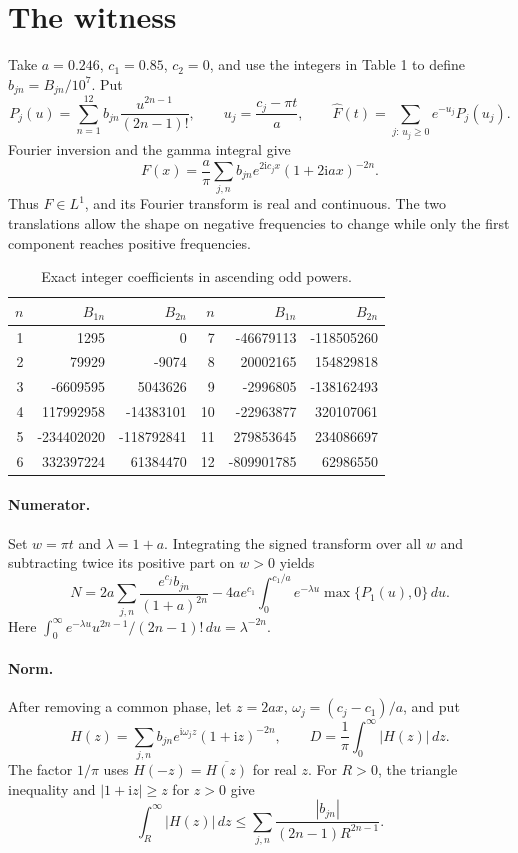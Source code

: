 \documentclass[11pt]{article}
\newcommand{\ii}{\mathrm i}
\begin{document}
\newpage
\section{The witness}
Take $a=0.246$, $c_1=0.85$, $c_2=0$, and use the integers in Table 1 to
define $b_{jn}=B_{jn}/10^7$. Put
\[
 P_j(u)=\sum_{n=1}^{12} b_{jn}\frac{u^{2n-1}}{(2n-1)!},\qquad
 u_j=\frac{c_j-\pi t}{a},\qquad
 \widehat F(t)=\sum_{j:\,u_j\ge0}e^{-u_j}P_j(u_j).
\]
Fourier inversion and the gamma integral give
\[
 F(x)=\frac a\pi\sum_{j,n} b_{jn} e^{2\ii c_jx}(1+2\ii ax)^{-2n}.
\]
Thus $F\in L^1$, and its Fourier transform is real and continuous. The
two translations allow the shape on negative frequencies to change while
only the first component reaches positive frequencies.

\begin{table}[h]
\centering
\begin{tabular}{r rr@{\qquad}r rr}
\toprule
$n$ & $B_{1n}$ & $B_{2n}$ & $n$ & $B_{1n}$ & $B_{2n}$ \\
\midrule
1 & 1295 & 0 & 7 & -46679113 & -118505260 \\
2 & 79929 & -9074 & 8 & 20002165 & 154829818 \\
3 & -6609595 & 5043626 & 9 & -2996805 & -138162493 \\
4 & 117992958 & -14383101 & 10 & -22963877 & 320107061 \\
5 & -234402020 & -118792841 & 11 & 279853645 & 234086697 \\
6 & 332397224 & 61384470 & 12 & -809901785 & 62986550 \\
\bottomrule
\end{tabular}
\caption{Exact integer coefficients in ascending odd powers.}
\end{table}

\paragraph{Numerator.} Set $w=\pi t$ and $\lambda=1+a$. Integrating the
signed transform over all $w$ and subtracting twice its positive part on
$w>0$ yields
\[
 N=2a\sum_{j,n}\frac{e^{c_j}b_{jn}}{(1+a)^{2n}}
       -4ae^{c_1}\int_0^{c_1/a}e^{-\lambda u}\max\{P_1(u),0\}\,du .
\]
Here $\int_0^\infty e^{-\lambda u}u^{2n-1}/(2n-1)!\,du=\lambda^{-2n}$.

\paragraph{Norm.} After removing a common phase, let $z=2ax$,
$\omega_j=(c_j-c_1)/a$, and put
\[
 H(z)=\sum_{j,n} b_{jn} e^{\ii\omega_j z}(1+\ii z)^{-2n},\qquad
 D=\frac1\pi\int_0^\infty |H(z)|\,dz .
\]
The factor $1/\pi$ uses $H(-z)=\overline{H(z)}$ for real $z$. For $R>0$,
the triangle inequality and $|1+\ii z|\ge z$ for $z>0$ give
\begin{equation}
 \int_R^\infty |H(z)|\,dz
 \le\sum_{j,n}\frac{|b_{jn}|}{(2n-1)R^{2n-1}} . \label{eq:tail}
\end{equation}
\end{document}
